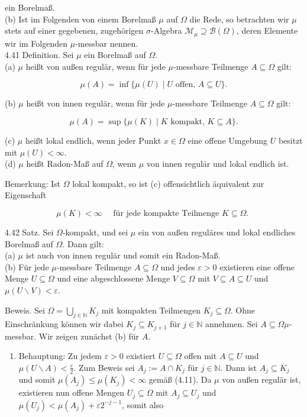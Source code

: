 \documentclass[10pt, letterpaper]{article}
\begin{document}
ein Borelmaß.\\
(b) Ist im Folgenden von einem Borelmaß $\mu$ auf $\Omega$ die Rede, so betrachten wir $\mu$ stets auf einer gegebenen, zugehörigen $\sigma$-Algebra $\mathcal{M}_{\mu} \supseteq \mathcal{B}(\Omega)$, deren Elemente wir im Folgenden $\mu$-messbar nennen.\\
4.41 Definition. Sei $\mu$ ein Borelmaß auf $\Omega$.\\
(a) $\mu$ heißt von außen regulär, wenn für jede $\mu$-messbare Teilmenge $A \subseteq \Omega$ gilt:

$$
\mu(A)=\inf \{\mu(U) \mid U \text { offen, } A \subseteq U\} .
$$

(b) $\mu$ heißt von innen regulär, wenn für jede $\mu$-messbare Teilmenge $A \subseteq \Omega$ gilt:

$$
\mu(A)=\sup \{\mu(K) \mid K \text { kompakt, } K \subseteq A\} .
$$

(c) $\mu$ heißt lokal endlich, wenn jeder Punkt $x \in \Omega$ eine offene Umgebung $U$ besitzt mit $\mu(U)<\infty$.\\
(d) $\mu$ heißt Radon-Maß auf $\Omega$, wenn $\mu$ von innen regulär und lokal endlich ist.

Bemerkung: Ist $\Omega$ lokal kompakt, so ist (c) offensichtlich äquivalent zur Eigenschaft

$$
\mu(K)<\infty \quad \text { für jede kompakte Teilmenge } K \subseteq \Omega \text {. }
$$

4.42 Satz. Sei $\Omega$-kompakt, und sei $\mu$ ein von außen reguläres und lokal endliches Borelmaß auf $\Omega$. Dann gilt:\\
(a) $\mu$ ist auch von innen regulär und somit ein Radon-Maß.\\
(b) Für jede $\mu$-messbare Teilmenge $A \subseteq \Omega$ und jedes $\varepsilon>0$ existieren eine offene Menge $U \subseteq \Omega$ und eine abgeschlossene Menge $V \subseteq \Omega$ mit $V \subseteq A \subseteq U$ und $\mu(U \backslash V)<\varepsilon$.

Beweis. Sei $\Omega=\bigcup_{j \in \mathbb{N}} K_{j}$ mit kompakten Teilmengen $K_{j} \subseteq \Omega$. Ohne Einschränkung können wir dabei $K_{j} \subseteq K_{j+1}$ für $j \in \mathbb{N}$ annehmen. Sei $A \subseteq \Omega \mu$-messbar. Wir zeigen zunächst (b) für $A$.

\begin{enumerate}
  \item Behauptung: Zu jedem $\varepsilon>0$ existiert $U \subseteq \Omega$ offen mit $A \subseteq U$ und $\mu(U \backslash A)<\frac{\varepsilon}{2}$. Zum Beweis sei $A_{j}:=A \cap K_{j}$ für $j \in \mathbb{N}$. Dann ist $A_{j} \subseteq K_{j}$ und somit $\mu\left(A_{j}\right) \leq \mu\left(K_{j}\right)<\infty$ gemäß (4.11). Da $\mu$ von außen regulär ist, existieren nun offene Mengen $U_{j} \subseteq \Omega$ mit $A_{j} \subseteq U_{j}$ und $\mu\left(U_{j}\right)<\mu\left(A_{j}\right)+\varepsilon 2^{-j-1}$, somit also
\end{enumerate}
\end{document}
